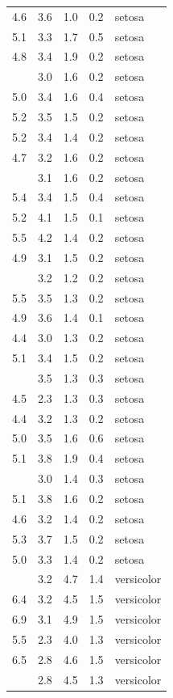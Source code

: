 \documentclass[12pt,]{krantz}
\theoremstyle{definition}
\theoremstyle{definition}
\theoremstyle{definition}
\theoremstyle{remark}
\begin{document}
\begin{longtable}[t]{rrrrl}
4.6 & 3.6 & 1.0 & 0.2 & setosa\\
5.1 & 3.3 & 1.7 & 0.5 & setosa\\
4.8 & 3.4 & 1.9 & 0.2 & setosa\\
\addlinespace
5.0 & 3.0 & 1.6 & 0.2 & setosa\\
5.0 & 3.4 & 1.6 & 0.4 & setosa\\
5.2 & 3.5 & 1.5 & 0.2 & setosa\\
5.2 & 3.4 & 1.4 & 0.2 & setosa\\
4.7 & 3.2 & 1.6 & 0.2 & setosa\\
\addlinespace
4.8 & 3.1 & 1.6 & 0.2 & setosa\\
5.4 & 3.4 & 1.5 & 0.4 & setosa\\
5.2 & 4.1 & 1.5 & 0.1 & setosa\\
5.5 & 4.2 & 1.4 & 0.2 & setosa\\
4.9 & 3.1 & 1.5 & 0.2 & setosa\\
\addlinespace
5.0 & 3.2 & 1.2 & 0.2 & setosa\\
5.5 & 3.5 & 1.3 & 0.2 & setosa\\
4.9 & 3.6 & 1.4 & 0.1 & setosa\\
4.4 & 3.0 & 1.3 & 0.2 & setosa\\
5.1 & 3.4 & 1.5 & 0.2 & setosa\\
\addlinespace
5.0 & 3.5 & 1.3 & 0.3 & setosa\\
4.5 & 2.3 & 1.3 & 0.3 & setosa\\
4.4 & 3.2 & 1.3 & 0.2 & setosa\\
5.0 & 3.5 & 1.6 & 0.6 & setosa\\
5.1 & 3.8 & 1.9 & 0.4 & setosa\\
\addlinespace
4.8 & 3.0 & 1.4 & 0.3 & setosa\\
5.1 & 3.8 & 1.6 & 0.2 & setosa\\
4.6 & 3.2 & 1.4 & 0.2 & setosa\\
5.3 & 3.7 & 1.5 & 0.2 & setosa\\
5.0 & 3.3 & 1.4 & 0.2 & setosa\\
\addlinespace
7.0 & 3.2 & 4.7 & 1.4 & versicolor\\
6.4 & 3.2 & 4.5 & 1.5 & versicolor\\
6.9 & 3.1 & 4.9 & 1.5 & versicolor\\
5.5 & 2.3 & 4.0 & 1.3 & versicolor\\
6.5 & 2.8 & 4.6 & 1.5 & versicolor\\
\addlinespace
5.7 & 2.8 & 4.5 & 1.3 & versicolor\\

\end{longtable}
\end{document}
